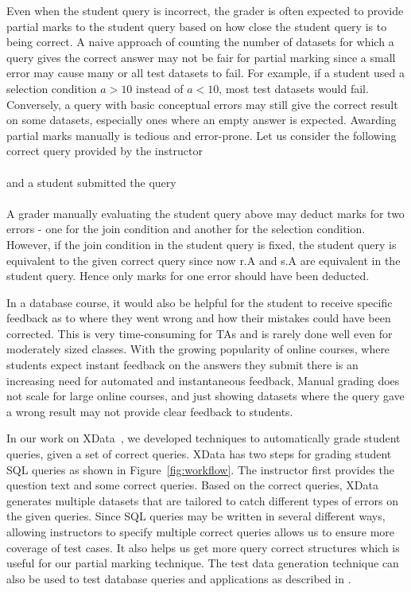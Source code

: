 Even when the student query is incorrect, the grader is often expected to provide partial marks to the student query based on how close the student query is to being correct.  A naive approach of counting the number of datasets for which a query gives the correct answer may not be fair for partial marking since a small error may cause many or all test datasets to fail.  For example, if a student used a selection condition $a>10$ instead of $a<10$, most test datasets would fail. Conversely, a query with basic conceptual errors may still give the correct result on some datasets, especially ones where an empty answer is expected. 
Awarding partial marks manually is tedious and error-prone. Let us consider the following correct query provided by the instructor\\
\\
and a student submitted the query \\
\\
A grader manually evaluating the student query above may deduct marks for two errors - one for the join condition and another for the selection condition. However, if the join condition in the student query is fixed, the student query is equivalent to the given correct query since now r.A and s.A are equivalent in the student query. Hence only marks for one error should have been deducted. 

In a database course, it would also be helpful for the student to receive specific feedback as to where they went wrong and how their mistakes could have been corrected. This is very time-consuming for TAs and is rarely done well even for moderately sized classes.  With the growing popularity of online courses, where students expect instant feedback on the answers they submit there is an increasing need for automated and instantaneous feedback,   Manual grading does not scale for large online courses, and just showing datasets where the query gave a wrong result may not provide clear feedback to students. 

In our work on XData~\cite{xdata:vldbj15,xdata:icde15,xdata:comad}, we developed techniques to automatically grade student queries, given a set of correct queries. 
XData has two steps for grading student SQL queries as shown in Figure~\ref{fig:workflow}. The instructor first provides the question text and some correct queries. Based on the correct queries, XData generates multiple datasets that are tailored to catch different types of errors on the given queries. Since SQL queries may be written in several different ways, allowing instructors to specify multiple correct queries allows us to ensure more coverage of test cases. It also helps us get more query correct structures which is useful for our partial marking technique. The test data generation technique can also be used to test database queries and applications as described in \cite{xdata:vldbj15, xdata:icde18}. 


